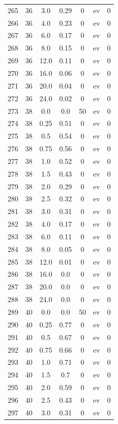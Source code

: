 \documentclass[12pt,a4paper]{article}
\begin{document}
\begin{tabular}{r|cccccc}
	265 & 36 & 3.0 & 0.29 & 0 & ev & 0 \\
	266 & 36 & 4.0 & 0.23 & 0 & ev & 0 \\
	267 & 36 & 6.0 & 0.17 & 0 & ev & 0 \\
	268 & 36 & 8.0 & 0.15 & 0 & ev & 0 \\
	269 & 36 & 12.0 & 0.11 & 0 & ev & 0 \\
	270 & 36 & 16.0 & 0.06 & 0 & ev & 0 \\
	271 & 36 & 20.0 & 0.04 & 0 & ev & 0 \\
	272 & 36 & 24.0 & 0.02 & 0 & ev & 0 \\
	273 & 38 & 0.0 & 0.0 & 50 & ev & 0 \\
	274 & 38 & 0.25 & 0.51 & 0 & ev & 0 \\
	275 & 38 & 0.5 & 0.54 & 0 & ev & 0 \\
	276 & 38 & 0.75 & 0.56 & 0 & ev & 0 \\
	277 & 38 & 1.0 & 0.52 & 0 & ev & 0 \\
	278 & 38 & 1.5 & 0.43 & 0 & ev & 0 \\
	279 & 38 & 2.0 & 0.29 & 0 & ev & 0 \\
	280 & 38 & 2.5 & 0.32 & 0 & ev & 0 \\
	281 & 38 & 3.0 & 0.31 & 0 & ev & 0 \\
	282 & 38 & 4.0 & 0.17 & 0 & ev & 0 \\
	283 & 38 & 6.0 & 0.11 & 0 & ev & 0 \\
	284 & 38 & 8.0 & 0.05 & 0 & ev & 0 \\
	285 & 38 & 12.0 & 0.01 & 0 & ev & 0 \\
	286 & 38 & 16.0 & 0.0 & 0 & ev & 0 \\
	287 & 38 & 20.0 & 0.0 & 0 & ev & 0 \\
	288 & 38 & 24.0 & 0.0 & 0 & ev & 0 \\
	289 & 40 & 0.0 & 0.0 & 50 & ev & 0 \\
	290 & 40 & 0.25 & 0.77 & 0 & ev & 0 \\
	291 & 40 & 0.5 & 0.67 & 0 & ev & 0 \\
	292 & 40 & 0.75 & 0.66 & 0 & ev & 0 \\
	293 & 40 & 1.0 & 0.71 & 0 & ev & 0 \\
	294 & 40 & 1.5 & 0.7 & 0 & ev & 0 \\
	295 & 40 & 2.0 & 0.59 & 0 & ev & 0 \\
	296 & 40 & 2.5 & 0.43 & 0 & ev & 0 \\
	297 & 40 & 3.0 & 0.31 & 0 & ev & 0 \\

\end{tabular}
\end{document}
